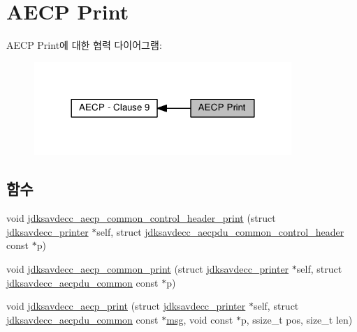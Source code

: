 \hypertarget{group__aecp__print}{}\section{A\+E\+CP Print}
\label{group__aecp__print}
A\+E\+CP Print에 대한 협력 다이어그램\+:
\nopagebreak
\begin{figure}[H]
\begin{center}
\leavevmode
\includegraphics[width=276pt]{group__aecp__print}
\end{center}
\end{figure}
\subsection*{함수}
\begin{DoxyCompactItemize}
\item 
void \hyperlink{group__aecp__print_ga2ef82802e058fc512eccb51f8611fab6}{jdksavdecc\+\_\+aecp\+\_\+common\+\_\+control\+\_\+header\+\_\+print} (struct \hyperlink{structjdksavdecc__printer}{jdksavdecc\+\_\+printer} $\ast$self, struct \hyperlink{structjdksavdecc__aecpdu__common__control__header}{jdksavdecc\+\_\+aecpdu\+\_\+common\+\_\+control\+\_\+header} const $\ast$p)
\item 
void \hyperlink{group__aecp__print_gabf23e817595afca199205bb410a5eca6}{jdksavdecc\+\_\+aecp\+\_\+common\+\_\+print} (struct \hyperlink{structjdksavdecc__printer}{jdksavdecc\+\_\+printer} $\ast$self, struct \hyperlink{structjdksavdecc__aecpdu__common}{jdksavdecc\+\_\+aecpdu\+\_\+common} const $\ast$p)
\item 
void \hyperlink{group__aecp__print_ga55696fd7b3b23ecc226d967db14291e5}{jdksavdecc\+\_\+aecp\+\_\+print} (struct \hyperlink{structjdksavdecc__printer}{jdksavdecc\+\_\+printer} $\ast$self, struct \hyperlink{structjdksavdecc__aecpdu__common}{jdksavdecc\+\_\+aecpdu\+\_\+common} const $\ast$\hyperlink{openavb__log_8c_a0c7e58a50354c4a4d6dad428d0e47029}{msg}, void const $\ast$p, ssize\+\_\+t pos, size\+\_\+t len)
\end{DoxyCompactItemize}
